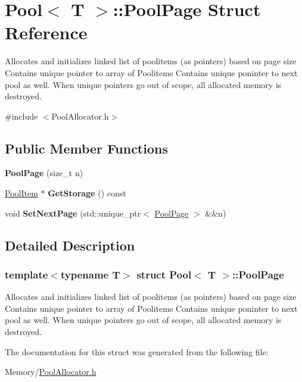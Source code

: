 \hypertarget{structPool_1_1PoolPage}{}\section{Pool$<$ T $>$\+:\+:Pool\+Page Struct Reference}
\label{structPool_1_1PoolPage}


Allocates and initializes linked list of poolitems (as pointers) based on page size Contains unique pointer to array of Poolitems Contains unique poninter to next pool as well. When unique pointers go out of scope, all allocated memory is destroyed.  




{\ttfamily \#include $<$Pool\+Allocator.\+h$>$}

\subsection*{Public Member Functions}
\begin{DoxyCompactItemize}
\item 
\mbox{\label{structPool_1_1PoolPage_afef7a665383a998fa091ece35d47a190}} 
{\bfseries Pool\+Page} (size\+\_\+t n)
\item 
\mbox{\label{structPool_1_1PoolPage_a9bc982e7b299e40a5b4f72e51c40cbe2}} 
\hyperlink{unionPool_1_1PoolItem}{Pool\+Item} $\ast$ {\bfseries Get\+Storage} () const
\item 
\mbox{\label{structPool_1_1PoolPage_aa1c17dc8da628fbf765fbd0ebcc6e26b}} 
void {\bfseries Set\+Next\+Page} (std\+::unique\+\_\+ptr$<$ \hyperlink{structPool_1_1PoolPage}{Pool\+Page} $>$ \&\&n)
\end{DoxyCompactItemize}


\subsection{Detailed Description}
\subsubsection*{template$<$typename T$>$\newline
struct Pool$<$ T $>$\+::\+Pool\+Page}

Allocates and initializes linked list of poolitems (as pointers) based on page size Contains unique pointer to array of Poolitems Contains unique poninter to next pool as well. When unique pointers go out of scope, all allocated memory is destroyed. 

The documentation for this struct was generated from the following file\+:\begin{DoxyCompactItemize}
\item 
Memory/\hyperlink{PoolAllocator_8h}{Pool\+Allocator.\+h}\end{DoxyCompactItemize}
